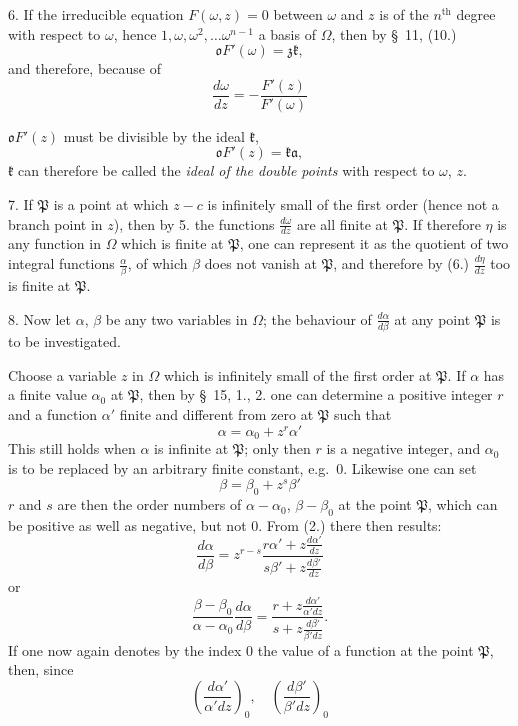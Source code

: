 \documentclass{article}
\begin{document}
6. If the irreducible equation $F(\omega, z) = 0$ between $\omega$ and $z$ is of the $n^{\text{th}}$ degree with respect to $\omega$, hence $1, \omega, \omega^{2}, \ldots \omega^{n-1}$ a basis of $\Omega$, then by §~11, (10.)
\[ \mathfrak{o}F'(\omega) = \mathfrak{z}\mathfrak{k}, \]
and therefore, because of
\[ \frac{d\omega}{dz} = -\frac{F'(z)}{F'(\omega)} \]

$\mathfrak{o}F'(z)$ must be divisible by the ideal $\mathfrak{k}$,
\[ \mathfrak{o}F'(z) = \mathfrak{k}\mathfrak{a}, \]
$\mathfrak{k}$ can therefore be called the \emph{ideal of the double points} with respect to $\omega$, $z$.

7. If $\mathfrak{P}$ is a point at which $z-c$ is infinitely small of the first order (hence not a branch point in $z$), then by 5. the functions $\frac{d\omega}{dz}$ are all finite at $\mathfrak{P}$. If therefore $\eta$ is any function in $\Omega$ which is finite at $\mathfrak{P}$, one can represent it as the quotient of two integral functions $\frac{\alpha}{\beta}$, of which $\beta$ does not vanish at $\mathfrak{P}$, and therefore by (6.) $\frac{d\eta}{dz}$ too is finite at $\mathfrak{P}$.

8. Now let $\alpha$, $\beta$ be any two variables in $\Omega$; the behaviour of $\frac{d\alpha}{d\beta}$ at any point $\mathfrak{P}$ is to be investigated.

Choose a variable $z$ in $\Omega$ which is infinitely small of the first order at $\mathfrak{P}$. If $\alpha$ has a finite value $\alpha_{0}$ at $\mathfrak{P}$, then by §~15, 1., 2. one can determine a positive integer $r$ and a function $\alpha'$ finite and different from zero at $\mathfrak{P}$ such that
\[ \alpha = \alpha_{0} + z^{r}\alpha' \]
This still holds when $\alpha$ is infinite at $\mathfrak{P}$; only then $r$ is a negative integer, and $\alpha_{0}$ is to be replaced by an arbitrary finite constant, e.g.\ 0. Likewise one can set
\[ \beta = \beta_{0} + z^{s}\beta' \]
$r$ and $s$ are then the order numbers of $\alpha-\alpha_{0}$, $\beta-\beta_{0}$ at the point $\mathfrak{P}$, which can be positive as well as negative, but not 0. From (2.) there then results:
\[ \frac{d\alpha}{d\beta} = z^{r-s}\frac{r\alpha' + z\frac{d\alpha'}{dz}}{s\beta' + z\frac{d\beta'}{dz}} \]
or
\[ \frac{\beta-\beta_{0}}{\alpha-\alpha_{0}}\frac{d\alpha}{d\beta} = \frac{r + z\frac{d\alpha'}{\alpha'dz}}{s + z\frac{d\beta'}{\beta'dz}}. \]
If one now again denotes by the index 0 the value of a function at the point $\mathfrak{P}$, then, since
\[ \left(\frac{d\alpha'}{\alpha'dz}\right)_{0}, \quad \left(\frac{d\beta'}{\beta'dz}\right)_{0} \]
\end{document}
